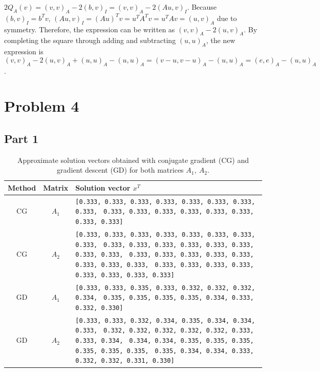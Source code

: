 \documentclass{article}
\begin{document}
\noindent $2Q_A(v) = (v,v)_A - 2(b,v)_I = (v,v)_A - 2(Au, v)_I$. Because $(b,v)_I = b^Tv$, $(Au, v)_I = (Au)^Tv = u^TA^Tv = u^TAv = (u, v)_A$ due to symmetry.
Therefore, the expression can be written as $(v,v)_A - 2(u,v)_A$. By completing the square through adding and subtracting $(u,u)_A$, the new 
expression is 
$$ (v,v)_A - 2(u,v)_A + (u,u)_A - (u,u)_A = (v-u,v-u)_A - (u,u)_A = (e,e)_A - (u,u)_A $$.

\section*{Problem 4}

\subsection*{Part 1}

\begin{table}[ht]
\centering
\caption{Approximate solution vectors obtained with conjugate gradient (CG)
and gradient descent (GD) for both matrices $A_1, \ A_2$.}
\label{tab:solution-vectors}
\renewcommand{\arraystretch}{1.3}
\begin{tabular}{c c p{11cm}}
\hline
Method & Matrix & Solution vector $x^T$ \\
\hline

CG & $A_1$ &
\texttt{[0.333, 0.333, 0.333, 0.333, 0.333, 0.333, 0.333, 0.333,} \newline
\texttt{ 0.333, 0.333, 0.333, 0.333, 0.333, 0.333, 0.333, 0.333]} \\[0.75em]

CG & $A_2$ &
\texttt{[0.333, 0.333, 0.333, 0.333, 0.333, 0.333, 0.333, 0.333,} \newline
\texttt{ 0.333, 0.333, 0.333, 0.333, 0.333, 0.333, 0.333, 0.333,} \newline
\texttt{ 0.333, 0.333, 0.333, 0.333, 0.333, 0.333, 0.333, 0.333,} \newline
\texttt{ 0.333, 0.333, 0.333, 0.333, 0.333, 0.333, 0.333, 0.333]} \\[0.75em]

GD & $A_1$ &
\texttt{[0.333, 0.333, 0.335, 0.333, 0.332, 0.332, 0.332, 0.334,} \newline
\texttt{ 0.335, 0.335, 0.335, 0.335, 0.334, 0.333, 0.332, 0.330]} \\[0.75em]

GD & $A_2$ &
\texttt{[0.333, 0.333, 0.332, 0.334, 0.335, 0.334, 0.334, 0.333,} \newline
\texttt{ 0.332, 0.332, 0.332, 0.332, 0.332, 0.333, 0.333, 0.334,} \newline
\texttt{ 0.334, 0.334, 0.335, 0.335, 0.335, 0.335, 0.335, 0.335,} \newline
\texttt{ 0.335, 0.334, 0.334, 0.333, 0.332, 0.332, 0.331, 0.330]} \\
\hline
\end{tabular}
\end{table}
\end{document}
